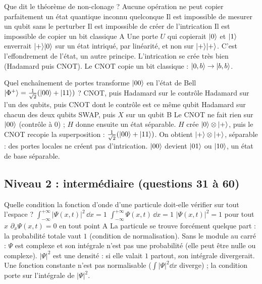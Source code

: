   {Que dit le théorème de non-clonage ?}
  {Aucune opération ne peut copier parfaitement un état quantique inconnu quelconque}
  {Il est impossible de mesurer un qubit sans le perturber}
  {Il est impossible de créer de l'intrication}
  {Il est impossible de copier un bit classique}
  {A}
\qcmx
  {Une porte $U$ qui copierait $|0\rangle$ et $|1\rangle$ enverrait $|+\rangle|0\rangle$ sur un état intriqué, par linéarité, et non sur $|+\rangle|+\rangle$.}
  {C'est l'effondrement de l'état, un autre principe.}
  {L'intrication se crée très bien (Hadamard puis CNOT).}
  {Le CNOT copie un bit classique : $|0,b\rangle\to|b,b\rangle$.}

  {Quel enchaînement de portes transforme $|00\rangle$ en l'état de Bell $|\Phi^+\rangle=\frac{1}{\sqrt2}(|00\rangle+|11\rangle)$ ?}
  {CNOT, puis Hadamard sur le contrôle}
  {Hadamard sur l'un des qubits, puis CNOT dont le contrôle est ce même qubit}
  {Hadamard sur chacun des deux qubits}
  {SWAP, puis $X$ sur un qubit}
  {B}
\qcmx
  {Le CNOT ne fait rien sur $|00\rangle$ (contrôle à $0$) ; $H$ donne ensuite un état séparable.}
  {$H$ crée $|0\rangle\otimes|+\rangle$, puis le CNOT recopie la superposition : $\frac{1}{\sqrt2}(|00\rangle+|11\rangle)$.}
  {On obtient $|+\rangle\otimes|+\rangle$, séparable : des portes locales ne créent pas d'intrication.}
  {$|00\rangle$ devient $|01\rangle$ ou $|10\rangle$, un état de base séparable.}

\clearpage
\subsection{Niveau 2 : intermédiaire (questions 31 à 60)}\label{sec:qcm-n2}
\par\smallskip
  {Quelle condition la fonction d'onde d'une particule doit-elle vérifier sur tout l'espace ?}
  {$\displaystyle\int_{-\infty}^{+\infty}|\Psi(x,t)|^2\,\dd x=1$}
  {$\displaystyle\int_{-\infty}^{+\infty}\Psi(x,t)\,\dd x=1$}
  {$|\Psi(x,t)|^2=1$ pour tout $x$}
  {$\partial_x\Psi(x,t)=0$ en tout point}
  {A}
\qcmx
  {La particule se trouve forcément quelque part : la probabilité totale vaut $1$ (condition de normalisation).}
  {Sans le module au carré : $\Psi$ est complexe et son intégrale n'est pas une probabilité (elle peut être nulle ou complexe).}
  {$|\Psi|^2$ est une densité : si elle valait $1$ partout, son intégrale divergerait.}
  {Une fonction constante n'est pas normalisable ($\int|\Psi|^2\dd x$ diverge) ; la condition porte sur l'intégrale de $|\Psi|^2$.}

